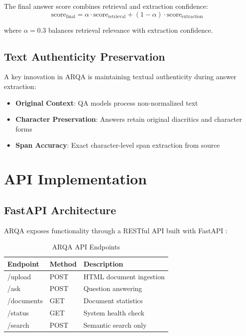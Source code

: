 \documentclass[conference]{IEEEtran}
\begin{document}
The final answer score combines retrieval and extraction confidence:
$$\text{score}_{\text{final}} = \alpha \cdot \text{score}_{\text{retrieval}} + (1-\alpha) \cdot \text{score}_{\text{extraction}}$$

where $\alpha = 0.3$ balances retrieval relevance with extraction confidence.

\subsection{Text Authenticity Preservation}
A key innovation in ARQA is maintaining textual authenticity during answer extraction:
\begin{itemize}
    \item \textbf{Original Context}: QA models process non-normalized text
    \item \textbf{Character Preservation}: Answers retain original diacritics and character forms
    \item \textbf{Span Accuracy}: Exact character-level span extraction from source
\end{itemize}

\section{API Implementation}

\subsection{FastAPI Architecture}
ARQA exposes functionality through a RESTful API built with FastAPI \cite{b10}:

\begin{table}[htbp]
\caption{ARQA API Endpoints}
\begin{center}
\begin{tabular}{|l|l|l|}
\hline
\textbf{Endpoint} & \textbf{Method} & \textbf{Description} \\
\hline
/upload & POST & HTML document ingestion \\
/ask & POST & Question answering \\
/documents & GET & Document statistics \\
/status & GET & System health check \\
/search & POST & Semantic search only \\
\hline
\end{tabular}
\label{table:api}
\end{center}
\end{table}
\end{document}
